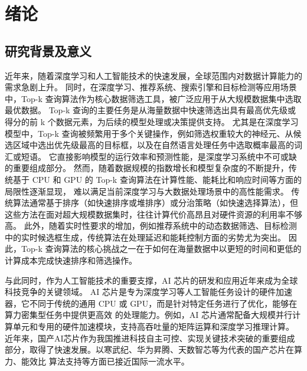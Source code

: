 \chapter{绪论}
\section{研究背景及意义}
近年来，随着深度学习和人工智能技术的快速发展，全球范围内对数据计算能力的需求急剧上升\cite{devlin2019bert}\cite{vaswani2017attention}。
同时，在深度学习\cite{vaswani2017attention}、推荐系统、搜索引擎\cite{wangningmapreduce}和目标检测\cite{krizhevsky2012imagenet}等应用场景中，Top-k 查询算法作为核心数据筛选工具，被广泛应用于从大规模数据集中选取最优数据\cite{韩希先2010tkep}。
Top-k 查询的主要任务是从海量数据中快速筛选出具有最高优先级或得分的前 k 个数据元素，为后续的模型处理或决策提供支持。
尤其是在深度学习模型中，Top-k 查询被频繁用于多个关键操作，例如筛选权重较大的神经元、从候选区域中选出优先级最高的目标框，以及在自然语言处理任务中选取概率最高的词汇或短语。
它直接影响模型的运行效率和预测性能，是深度学习系统中不可或缺的重要组成部分。\cite{zeng2024turn}
然而，随着数据规模的指数增长和模型复杂度的不断提升，传统基于 CPU 和 GPU 的 Top-k 查询算法在计算性能、能耗比和响应时间等方面的局限性逐渐显现，
难以满足当前深度学习与大数据处理场景中的高性能需求\cite{sgherzi2022mixed}。
传统算法通常基于排序（如快速排序或堆排序）或分治策略（如快速选择算法），但这些方法在面对超大规模数据集时，往往计算代价高昂且对硬件资源的利用率不够高。
此外，随着实时性要求的增加，例如推荐系统中的动态数据筛选、目标检测中的实时候选框生成，传统算法在处理延迟和能耗控制方面的劣势尤为突出。
因此，Top-k 查询算法的核心挑战之一在于如何在海量数据中以更短的时间和更低的计算成本完成快速排序和筛选操作。

与此同时，作为人工智能技术的重要支撑，AI 芯片的研发和应用近年来成为全球科技竞争的关键领域。
AI 芯片是专为深度学习等人工智能任务设计的硬件加速器，它不同于传统的通用 CPU 或 GPU，而是针对特定任务进行了优化，能够在算力密集型任务中提供更高效
的处理能力。例如，AI 芯片通常配备大规模并行计算单元和专用的硬件加速模块，支持高吞吐量的矩阵运算和深度学习推理计算。
近年来，国产AI芯片作为我国推进科技自主可控、实现关键技术突破的重要组成部分，取得了快速发展。以寒武纪、华为昇腾、天数智芯等为代表的国产芯片在算力、能效比
算法支持等方面已接近国际一流水平\cite{ZWQY201725011}\cite{GCKX202501012}。


